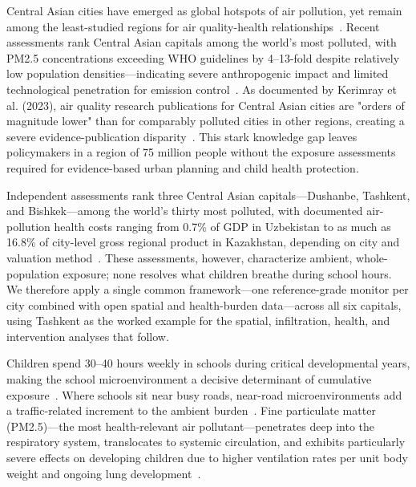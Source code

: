\documentclass[11pt,a4paper]{article}
\begin{document}
Central Asian cities have emerged as global hotspots of air pollution, yet remain among the least-studied regions for air quality-health relationships~\cite{worldbank2024centralasia}. Recent assessments rank Central Asian capitals among the world's most polluted, with PM2.5 concentrations exceeding WHO guidelines by 4--13-fold despite relatively low population densities---indicating severe anthropogenic impact and limited technological penetration for emission control~\cite{tursumbayeva2023}. As documented by Kerimray et al. (2023), air quality research publications for Central Asian cities are "orders of magnitude lower" than for comparably polluted cities in other regions, creating a severe evidence-publication disparity~\cite{tursumbayeva2023}. This stark knowledge gap leaves policymakers in a region of 75 million people without the exposure assessments required for evidence-based urban planning and child health protection.

Independent assessments rank three Central Asian capitals---Dushanbe, Tashkent, and Bishkek---among the world's thirty most polluted, with documented air-pollution health costs ranging from 0.7\% of GDP in Uzbekistan to as much as 16.8\% of city-level gross regional product in Kazakhstan, depending on city and valuation method~\cite{worldbank2024centralasia,unece2024uzbekistan,tursumbayeva2023}. These assessments, however, characterize ambient, whole-population exposure; none resolves what children breathe during school hours. We therefore apply a single common framework---one reference-grade monitor per city combined with open spatial and health-burden data---across all six capitals, using Tashkent as the worked example for the spatial, infiltration, health, and intervention analyses that follow.

Children spend 30--40 hours weekly in schools during critical developmental years, making the school microenvironment a decisive determinant of cumulative exposure~\cite{gauderman2015association,gehring2013air}. Where schools sit near busy roads, near-road microenvironments add a traffic-related increment to the ambient burden~\cite{who2021guidelines,apte2017high}. Fine particulate matter (PM2.5)---the most health-relevant air pollutant---penetrates deep into the respiratory system, translocates to systemic circulation, and exhibits particularly severe effects on developing children due to higher ventilation rates per unit body weight and ongoing lung development~\cite{pope2004cardiovascular,brook2010particulate,schwartz2004air}.
\end{document}
